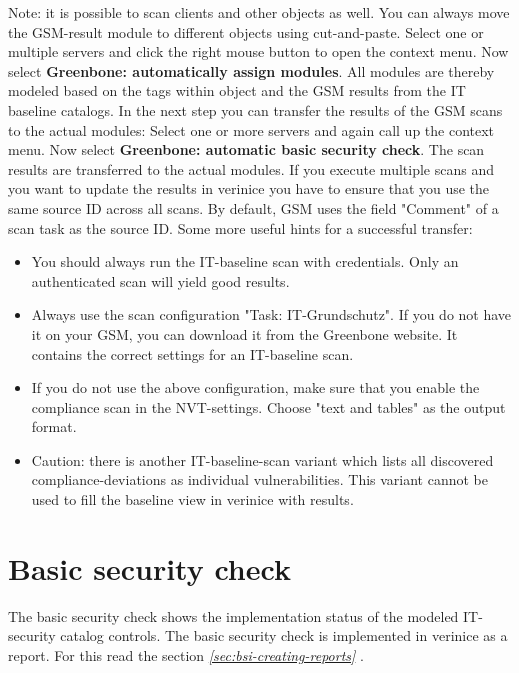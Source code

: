 \documentclass[a4paper,10pt]{book}
\begin{document}
Note: it is possible to scan clients and other objects as well. You can
always move the GSM-result module to different objects using cut-and-paste.
Select one or multiple servers and click the right mouse button to open the context menu. Now select \textbf{Greenbone: automatically assign modules}.
 All modules are thereby modeled based on the tags within object and the GSM results from the IT baseline catalogs.
 In the next step you can transfer the results of the GSM scans to the
 actual modules:
 Select one or more servers and
 again call up the context menu. Now select \textbf{Greenbone: automatic basic security check}.
The scan results are transferred to the actual modules. If you execute multiple scans and you want to update the results in verinice you have to ensure that you use the same source ID across all scans. By default, GSM uses the field "Comment" of a scan task as the source ID.
Some more useful hints for a successful transfer:
\begin{itemize}
    \item You should always run the IT-baseline scan with credentials. Only an authenticated scan will yield good results.
    \item Always use the scan configuration "Task: IT-Grundschutz". If you do not have it on your GSM, you can download it from the Greenbone website. It contains the correct settings for an IT-baseline scan.
    \item If you do not use the above configuration, make sure that you enable the compliance scan in the NVT-settings. Choose "text and tables" as the output format.
    \item Caution: there is another IT-baseline-scan variant which lists all discovered compliance-deviations as individual vulnerabilities. This variant cannot be used to fill the baseline view in verinice with results.
\end{itemize}

\section{Basic security check}
The basic security check shows the implementation status of the
modeled IT-security catalog controls.  The basic security check is
implemented in verinice as a report. For this read the section {\em
  \ref{sec:bsi-creating-reports} }.
\end{document}
